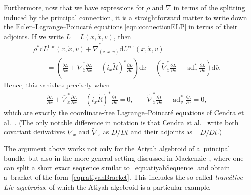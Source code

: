 \documentclass[pdftex]{sigma}
\numberwithin{equation}{section}
\begin{document}
 Furthermore, now that we have expressions for $ \rho $ and $ \overline{ \nabla } $ in terms of the splitting induced by the principal connection, it is a straightforward matter to write down the Euler--Lagrange--Poincar\'e equations \eqref{eqn:connectionELP} in terms of their adjoints. If we write $ L = L ( x, \dot{x}, \overline{ v } ) $, then
 \begin{gather*}
 \rho ^\ast \mathrm{d} L ^{ \text{hor} } ( x, \dot{x}, \overline{ v } ) + \overline{ \nabla } _{ ( x, \dot{x}, \overline{ v } ) } ^\ast \mathrm{d} L ^{ \text{ver} } ( x, \dot{x}, \overline{ v } ) \\
 \qquad{} = \left( \frac{ \partial L }{ \partial x } + \overline{ \nabla } _{ \dot{x} } ^\ast \frac{ \partial L }{ \partial \dot{x} } - ( i
 _{\dot{x}} \widetilde{ R } ) ^\ast \frac{ \partial L }{ \partial \overline{ v } } \right) \mathrm{d}x + \left( \widetilde{
 \nabla } _{ \dot{x} } ^\ast \frac{ \partial L }{ \partial \overline{ v } } + \operatorname{ad} _{ \overline{ v } } ^\ast
 \frac{ \partial L }{ \partial \overline{ v } } \right) \mathrm{d} \overline{ v } .
 \end{gather*}
 Hence, this vanishes precisely when
 \begin{gather*}
 \frac{ \partial L }{ \partial x } + \overline{ \nabla } _{ \dot{x} } ^\ast \frac{ \partial L }{ \partial \dot{x} } - ( i _{\dot{x}} \widetilde{ R } ) ^\ast \frac{ \partial L }{ \partial \overline{ v } } = 0 , \qquad \widetilde{ \nabla } _{ \dot{x} } ^\ast \frac{ \partial L }{ \partial
 \overline{ v } } + \operatorname{ad} _{ \overline{ v } } ^\ast \frac{ \partial L }{ \partial \overline{ v } } = 0 ,
 \end{gather*}
which are exactly the coordinate-free Lagrange--Poincar\'e equations of Cendra et al.~\cite[Theorem~3.4.1]{CeMaRa2001}. (The only notable dif\/ference
 in notation is that Cendra et al.~\cite{CeMaRa2001} write both covariant derivatives $ \overline{ \nabla } _{ \dot{x} } $ and $ \widetilde{ \nabla } _{ \dot{x} } $ as $ {D} / {D} t $ and their adjoints as $ - {D} / {D} t $.)

\begin{Remark} The argument above works not only for the Atiyah algebroid of a~principal bundle, but also in the more general setting discussed in Mackenzie~\cite[Chapter~7]{Mackenzie2005}, where one can split a short exact sequence similar to~\eqref{eqn:atiyahSequence} and obtain a~bracket of the form~\eqref{eqn:atiyahBracket}. This includes the so-called \emph{transitive Lie algebroids}, of which the Atiyah algebroid is a particular example.
\end{Remark}
\end{document}
